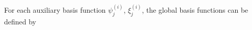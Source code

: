 \documentclass[preprint,12pt]{elsarticle}
\begin{document}
For each auxiliary basis function $\psi_{j}^{(i)}$, $\xi_j^{(i)}$, the global basis functions can be defined by 
\end{document}
